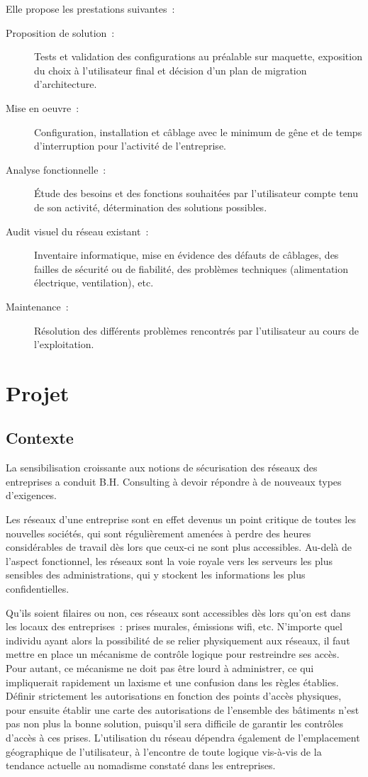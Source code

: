 Elle propose les prestations suivantes~:

\begin{description}
\item[Proposition de solution~:] Tests et validation des configurations au préalable sur maquette, exposition du choix à l’utilisateur final et décision d’un plan de migration d’architecture.
\item[Mise en oeuvre~:] Configuration, installation et câblage avec le minimum de gêne et de temps d’interruption pour l’activité de l’entreprise.
\item[Analyse fonctionnelle~:] Étude des besoins et des fonctions souhaitées par l’utilisateur compte tenu de son activité, détermination des solutions possibles.
\item[Audit visuel du réseau existant~:] Inventaire informatique, mise en évidence des défauts de câblages, des failles de sécurité ou de fiabilité, des problèmes techniques (alimentation électrique, ventilation), etc.
\item[Maintenance~:] Résolution des différents problèmes rencontrés par l’utilisateur au cours de l’exploitation.
\end{description}

\section{Projet}
\subsection{Contexte}

La sensibilisation croissante aux notions de sécurisation des réseaux des entreprises a conduit B.H. Consulting à devoir répondre à de nouveaux types d'exigences.

Les réseaux d'une entreprise sont en effet devenus un point critique de toutes les nouvelles sociétés, qui sont régulièrement amenées à perdre des heures considérables de travail dès lors que ceux-ci ne sont plus accessibles. Au-delà de l'aspect fonctionnel, les réseaux sont la voie royale vers les serveurs les plus sensibles des administrations, qui y stockent les informations les plus confidentielles.

Qu'ils soient filaires ou non, ces réseaux sont accessibles dès lors qu'on est dans les locaux des entreprises~: prises murales, émissions wifi, etc. N'importe quel individu ayant alors la possibilité de se relier physiquement aux réseaux, il faut mettre en place un mécanisme de contrôle logique pour restreindre ses accès. Pour autant, ce mécanisme ne doit pas être lourd à administrer, ce qui impliquerait rapidement un laxisme et une confusion dans les règles établies. Définir strictement les autorisations en fonction des points d'accès physiques, pour ensuite établir une carte des autorisations de l'ensemble des bâtiments n'est pas non plus la bonne solution, puisqu'il sera difficile de garantir les contrôles d'accès à ces prises. L'utilisation du réseau dépendra également de  l'emplacement géographique de l'utilisateur, à l'encontre de toute logique vis-à-vis de la tendance actuelle au nomadisme constaté dans les entreprises.

